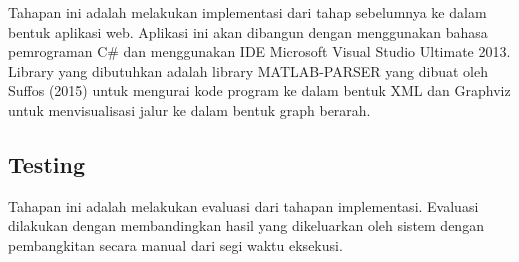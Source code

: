 Tahapan ini adalah melakukan implementasi dari tahap sebelumnya ke dalam bentuk aplikasi web. Aplikasi ini akan dibangun dengan menggunakan bahasa pemrograman C\# dan menggunakan IDE Microsoft Visual Studio Ultimate 2013. Library yang dibutuhkan adalah library MATLAB-PARSER yang dibuat oleh Suffos (2015) untuk mengurai kode program ke dalam bentuk XML dan Graphviz untuk menvisualisasi jalur ke dalam bentuk graph berarah.

\subsection*{Testing}

Tahapan ini adalah melakukan evaluasi dari tahapan implementasi. Evaluasi dilakukan dengan membandingkan hasil yang dikeluarkan oleh sistem dengan pembangkitan secara manual dari segi waktu eksekusi. 
